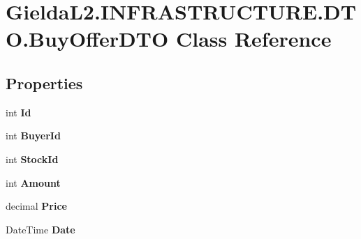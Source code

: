 \hypertarget{class_gielda_l2_1_1_i_n_f_r_a_s_t_r_u_c_t_u_r_e_1_1_d_t_o_1_1_buy_offer_d_t_o}{}\section{Gielda\+L2.\+I\+N\+F\+R\+A\+S\+T\+R\+U\+C\+T\+U\+R\+E.\+D\+T\+O.\+Buy\+Offer\+D\+TO Class Reference}
\label{class_gielda_l2_1_1_i_n_f_r_a_s_t_r_u_c_t_u_r_e_1_1_d_t_o_1_1_buy_offer_d_t_o}
\subsection*{Properties}
\begin{DoxyCompactItemize}
\item 
\mbox{\label{class_gielda_l2_1_1_i_n_f_r_a_s_t_r_u_c_t_u_r_e_1_1_d_t_o_1_1_buy_offer_d_t_o_a14980bffd55453e3ad5d8c134a6fa4d2}} 
int {\bfseries Id}
\item 
\mbox{\label{class_gielda_l2_1_1_i_n_f_r_a_s_t_r_u_c_t_u_r_e_1_1_d_t_o_1_1_buy_offer_d_t_o_a3e5ba39004a5a5bdef7c1e3d01172036}} 
int {\bfseries Buyer\+Id}
\item 
\mbox{\label{class_gielda_l2_1_1_i_n_f_r_a_s_t_r_u_c_t_u_r_e_1_1_d_t_o_1_1_buy_offer_d_t_o_a33e584ecfafb848ad70c85c54ea6df43}} 
int {\bfseries Stock\+Id}
\item 
\mbox{\label{class_gielda_l2_1_1_i_n_f_r_a_s_t_r_u_c_t_u_r_e_1_1_d_t_o_1_1_buy_offer_d_t_o_aad279505a632a745cb059b4f892f4ee5}} 
int {\bfseries Amount}
\item 
\mbox{\label{class_gielda_l2_1_1_i_n_f_r_a_s_t_r_u_c_t_u_r_e_1_1_d_t_o_1_1_buy_offer_d_t_o_abe1f0b00d92523e2635471196250cfcc}} 
decimal {\bfseries Price}
\item 
\mbox{\label{class_gielda_l2_1_1_i_n_f_r_a_s_t_r_u_c_t_u_r_e_1_1_d_t_o_1_1_buy_offer_d_t_o_afeb74615d881ba5c7085c96e021f79f4}} 
Date\+Time {\bfseries Date}
\end{DoxyCompactItemize}



